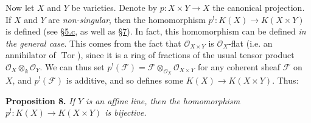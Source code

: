 \documentclass{article}
\newenvironment{itenv}[1]
  {\phantomsection\par\medskip\noindent\textbf{#1.}\itshape}
  {\medskip}
\newcommand{\scr}[1]{{\mathscr{#1}}}
\DeclareMathOperator{\Tor}{Tor}
\begin{document}
Now let $X$ and $Y$ be varieties.
Denote by $p\colon X\times Y\to X$ the canonical projection.
If $X$ and $Y$ are \emph{non-singular}, then the homomorphism $p^!\colon K(X)\to K(X\times Y)$ is defined (see \hyperref[subsection5c]{\S5.c}, as well as \hyperref[section7]{\S7}).
In fact, this homomorphism can be defined \emph{in the general case}.
This comes from the fact that $\scr{O}_{X\times Y}$ is $\scr{O}_X$-flat (i.e. an annihilator of $\Tor$), since it is a ring of fractions of the usual tensor product $\scr{O}_X\otimes_k\scr{O}_Y$.
We can thus set $p^!(\scr{F})=\scr{F}\otimes_{\scr{O}_X}\scr{O}_{X\times Y}$ for any coherent sheaf $\scr{F}$ on $X$, and $p^!(\scr{F})$ is additive, and so defines some $K(X)\to K(X\times Y)$.
Thus:

\begin{itenv}{Proposition 8}
\label{proposition8}
  If $Y$ is an affine line, then the homomorphism $p^!\colon K(X)\to K(X\times Y)$ is bijective.
\end{itenv}
\end{document}

